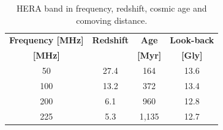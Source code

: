 \documentclass[ars]{copernicus}
\begin{document}


\begin{table}[t]
\caption{HERA band in frequency, redshift, cosmic age and comoving distance.}
\label{tab:heraband}
\vskip4mm
\centering
\begin{tabular}{| c | c | c | c |} \hline
\textbf{Frequency [MHz]} & \textbf{Redshift} & \textbf{Age} & \textbf{Look-back} \\
\textbf{[MHz]}                   &                            & \textbf{[Myr]}  & \textbf{[Gly]} \\ \hline
50 & 27.4    & 164 & 13.6 \\ \hline
100 & 13.2  & 372 & 13.4 \\ \hline
200  & 6.1    & 960  & 12.8 \\ \hline
225  &  5.3   & 1,135  &  12.7 \\ \hline
\end{tabular}
\end{table}





\end{document}
